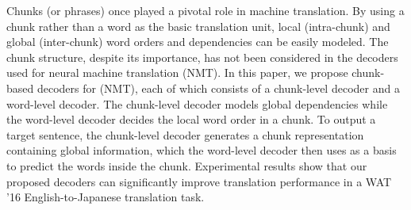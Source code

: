 Chunks (or phrases) once played a pivotal role in machine translation. By using a chunk rather than a word as the basic translation unit, local (intra-chunk) and global (inter-chunk) word orders and dependencies can be easily modeled. The chunk structure, despite its importance, has not been considered in the decoders used for neural machine translation (NMT). In this paper, we propose chunk-based decoders for (NMT), each of which consists of a chunk-level decoder and a word-level decoder. The chunk-level decoder models global dependencies while the word-level decoder decides the local word order in a chunk. To output a target sentence, the chunk-level decoder generates a chunk representation containing global information, which the word-level decoder then uses as a basis to predict the words inside the chunk. Experimental results show that our proposed decoders can significantly improve translation performance in a WAT '16 English-to-Japanese translation task.
